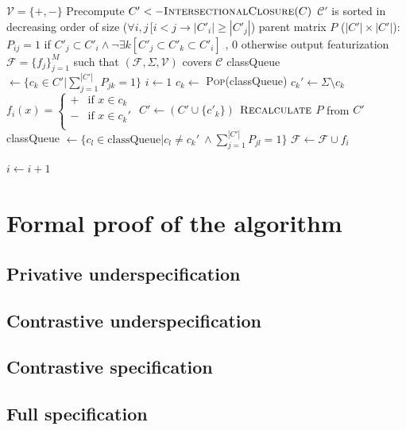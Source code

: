 \documentclass[11pt, oneside]{article}   	%
\begin{document}
\vspace{\baselineskip} \noindent \begin{algorithmic}
	\REQUIRE $\mathcal V = \{ +, - \}$
	\REQUIRE Precompute $C' <- \textsc{IntersectionalClosure}(C)$
	\REQUIRE $\mathcal C'$ is sorted in decreasing order of size ($\forall i, j \, [i < j \rightarrow |C'_i| \geq |C'_j|$)
	\REQUIRE parent matrix $P$ ($|C'| \times |C'|$): $P_{ij} = 1$ if $C'_j \subset C'_i \land \neg \exists k [C'_j \subset C'_k \subset C'_i]$ , $0$ otherwise
	\ENSURE output featurization $\mathcal F = \{ f_j \}_{j=1}^M$ such that $(\mathcal F, \Sigma, \mathcal V)$ covers $\mathcal C$
	\STATE
	\STATE classQueue $\leftarrow \{c_k \in C' | \sum_{j=1}^{|C'|}P_{jk} = 1 \}$
	\STATE $i \leftarrow 1$
	\STATE
	\STATE $c_k \leftarrow$ \textsc{Pop}(classQueue)
	\STATE $c_k' \leftarrow \Sigma \setminus c_k$
	\STATE $f_i(x) = \begin{cases}
	+ & \mbox{if } x \in c_k \\
	- & \mbox{if } x \in c_k' \\
	\end{cases} $
	\STATE $C' \leftarrow (C' \cup \{c'_k\})$
	\STATE $\textsc{Recalculate}$ $ P $ from $C'$
	\STATE classQueue $\leftarrow \{c_l \in \mbox{classQueue} | c_l \not= c_k' \ \land \sum_{j=1}^{|C'|}P_{jl} = 1 \}$
	\STATE $\mathcal F \leftarrow \mathcal F \cup f_i$
	
	\STATE $i \leftarrow i + 1$
	\ENDWHILE
\end{algorithmic}

\appendix

\section{Formal proof of the algorithm}

\subsection{Privative underspecification}

\subsection{Contrastive underspecification}

\subsection{Contrastive specification}

\subsection{Full specification}
\end{document}
